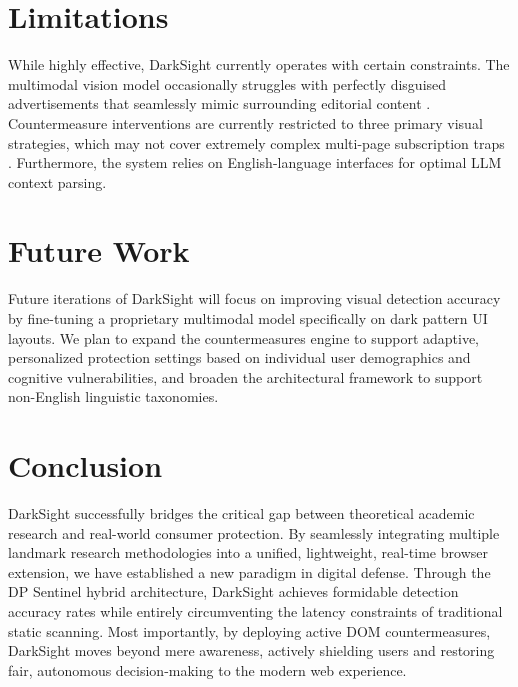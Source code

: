 \documentclass[12pt,a4paper]{article}
\begin{document}
\section{Limitations}
While highly effective, DarkSight currently operates with certain constraints. The multimodal vision model occasionally struggles with perfectly disguised advertisements that seamlessly mimic surrounding editorial content \cite{kocyigit2025}. Countermeasure interventions are currently restricted to three primary visual strategies, which may not cover extremely complex multi-page subscription traps \cite{schaefer2024}. Furthermore, the system relies on English-language interfaces for optimal LLM context parsing.

\section{Future Work}
Future iterations of DarkSight will focus on improving visual detection accuracy by fine-tuning a proprietary multimodal model specifically on dark pattern UI layouts. We plan to expand the countermeasures engine to support adaptive, personalized protection settings based on individual user demographics and cognitive vulnerabilities, and broaden the architectural framework to support non-English linguistic taxonomies.

\section{Conclusion}
DarkSight successfully bridges the critical gap between theoretical academic research and real-world consumer protection. By seamlessly integrating multiple landmark research methodologies into a unified, lightweight, real-time browser extension, we have established a new paradigm in digital defense. Through the DP Sentinel hybrid architecture, DarkSight achieves formidable detection accuracy rates while entirely circumventing the latency constraints of traditional static scanning. Most importantly, by deploying active DOM countermeasures, DarkSight moves beyond mere awareness, actively shielding users and restoring fair, autonomous decision-making to the modern web experience.
\end{document}
